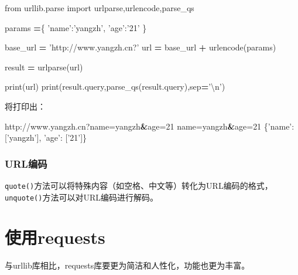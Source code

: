 \documentclass[]{ctexbook}
\newenvironment{Shaded}{\begin{snugshade}}{\end{snugshade}}
\newcommand{\BuiltInTok}[1]{#1}
\newcommand{\CharTok}[1]{\textcolor[rgb]{0.31,0.60,0.02}{#1}}
\newcommand{\ExtensionTok}[1]{#1}
\newcommand{\ImportTok}[1]{#1}
\newcommand{\KeywordTok}[1]{\textcolor[rgb]{0.13,0.29,0.53}{\textbf{#1}}}
\newcommand{\NormalTok}[1]{#1}
\newcommand{\OperatorTok}[1]{\textcolor[rgb]{0.81,0.36,0.00}{\textbf{#1}}}
\newcommand{\StringTok}[1]{\textcolor[rgb]{0.31,0.60,0.02}{#1}}
\newcommand{\VariableTok}[1]{\textcolor[rgb]{0.00,0.00,0.00}{#1}}
\begin{document}
\begin{Shaded}
\begin{Highlighting}[]
\ImportTok{from}\NormalTok{ urllib.parse }\ImportTok{import}\NormalTok{ urlparse,urlencode,parse_qs}

\NormalTok{params }\OperatorTok{=}\NormalTok{\{}
    \StringTok{'name'}\NormalTok{:}\StringTok{'yangzh'}\NormalTok{,}
    \StringTok{'age'}\NormalTok{:}\StringTok{'21'}
\NormalTok{\}}

\NormalTok{base_url }\OperatorTok{=} \StringTok{'http://www.yangzh.cn?'}
\NormalTok{url }\OperatorTok{=}\NormalTok{ base_url }\OperatorTok{+}\NormalTok{ urlencode(params)}

\NormalTok{result }\OperatorTok{=}\NormalTok{ urlparse(url)}

\BuiltInTok{print}\NormalTok{(url)}
\BuiltInTok{print}\NormalTok{(result.query,parse_qs(result.query),sep}\OperatorTok{=}\StringTok{'}\CharTok{\textbackslash{}n}\StringTok{'}\NormalTok{)}
\end{Highlighting}
\end{Shaded}

将打印出：

\begin{Shaded}
\begin{Highlighting}[]
\ExtensionTok{http}\NormalTok{://www.yangzh.cn?name=yangzh}\KeywordTok{&}\VariableTok{age=}\NormalTok{21}
\VariableTok{name=}\NormalTok{yangzh}\KeywordTok{&}\VariableTok{age=}\NormalTok{21}
\NormalTok{\{}\StringTok{'name'}\NormalTok{: [}\StringTok{'yangzh'}\NormalTok{], }\StringTok{'age'}\NormalTok{: [}\StringTok{'21'}\NormalTok{]\}}
\end{Highlighting}
\end{Shaded}

\hypertarget{urlux7f16ux7801}{%
\subsubsection{URL编码}\label{urlux7f16ux7801}}

\texttt{quote()}方法可以将特殊内容（如空格、中文等）转化为URL编码的格式，\texttt{unquote()}方法可以对URL编码进行解码。

\hypertarget{ux4f7fux7528requests}{%
\section{使用requests}\label{ux4f7fux7528requests}}

与urllib库相比，requests库要更为简洁和人性化，功能也更为丰富。
\end{document}
